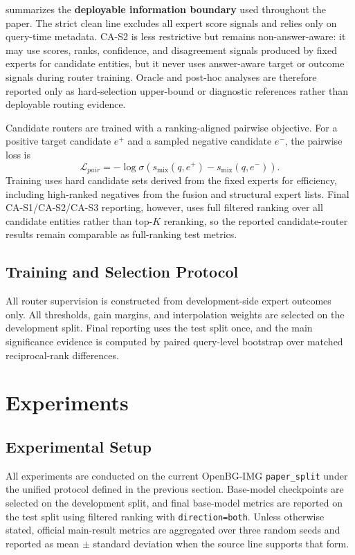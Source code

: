 \documentclass[11pt]{article}
\begin{document}
 summarizes the \textbf{deployable information boundary} used throughout the paper. The strict clean line excludes all expert score signals and relies only on query-time metadata. CA-S2 is less restrictive but remains non-answer-aware: it may use scores, ranks, confidence, and disagreement signals produced by fixed experts for candidate entities, but it never uses answer-aware target or outcome signals during router training. Oracle and post-hoc analyses are therefore reported only as hard-selection upper-bound or diagnostic references rather than deployable routing evidence.

Candidate routers are trained with a ranking-aligned pairwise objective. For a positive target candidate $e^+$ and a sampled negative candidate $e^-$, the pairwise loss is
\[
\mathcal{L}_{pair}=-\log \sigma(s_{\text{mix}}(q,e^+)-s_{\text{mix}}(q,e^-)).
\]
Training uses hard candidate sets derived from the fixed experts for efficiency, including high-ranked negatives from the fusion and structural expert lists. Final CA-S1/CA-S2/CA-S3 reporting, however, uses full filtered ranking over all candidate entities rather than top-$K$ reranking, so the reported candidate-router results remain comparable as full-ranking test metrics.

\subsection{Training and Selection Protocol}
All router supervision is constructed from development-side expert outcomes only. All thresholds, gain margins, and interpolation weights are selected on the development split. Final reporting uses the test split once, and the main significance evidence is computed by paired query-level bootstrap over matched reciprocal-rank differences.

\section{Experiments}
\subsection{Experimental Setup}
All experiments are conducted on the current OpenBG-IMG \texttt{paper\_split} under the unified protocol defined in the previous section. Base-model checkpoints are selected on the development split, and final base-model metrics are reported on the test split using filtered ranking with \texttt{direction=both}. Unless otherwise stated, official main-result metrics are aggregated over three random seeds and reported as mean $\pm$ standard deviation when the source line supports that form.
\end{document}

